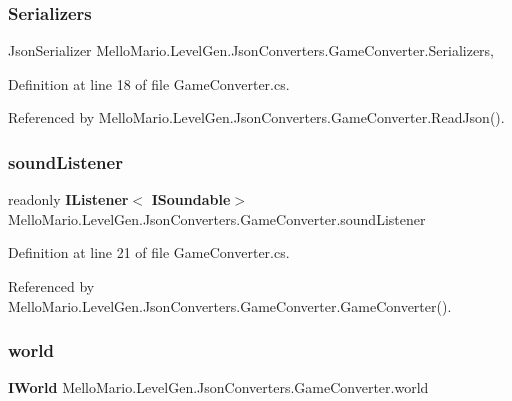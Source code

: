 \subsubsection{Serializers}
{\footnotesize\ttfamily Json\+Serializer Mello\+Mario.\+Level\+Gen.\+Json\+Converters.\+Game\+Converter.\+Serializers\hspace{0.3cm}{\ttfamily [static]}, {\ttfamily [private]}}



Definition at line 18 of file Game\+Converter.\+cs.



Referenced by Mello\+Mario.\+Level\+Gen.\+Json\+Converters.\+Game\+Converter.\+Read\+Json().

\mbox{\label{classMelloMario_1_1LevelGen_1_1JsonConverters_1_1GameConverter_ab1ddcc17ca7f552be57a94b08ec4b404}} 
\subsubsection{sound\+Listener}
{\footnotesize\ttfamily readonly \textbf{ I\+Listener}$<$\textbf{ I\+Soundable}$>$ Mello\+Mario.\+Level\+Gen.\+Json\+Converters.\+Game\+Converter.\+sound\+Listener\hspace{0.3cm}{\ttfamily [private]}}



Definition at line 21 of file Game\+Converter.\+cs.



Referenced by Mello\+Mario.\+Level\+Gen.\+Json\+Converters.\+Game\+Converter.\+Game\+Converter().

\mbox{\label{classMelloMario_1_1LevelGen_1_1JsonConverters_1_1GameConverter_ae62b4a52fc35302fc24660f69721720b}} 
\subsubsection{world}
{\footnotesize\ttfamily \textbf{ I\+World} Mello\+Mario.\+Level\+Gen.\+Json\+Converters.\+Game\+Converter.\+world\hspace{0.3cm}{\ttfamily [private]}}



